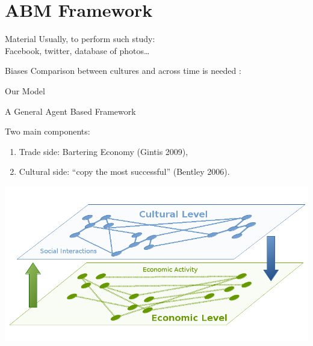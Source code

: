 \documentclass[12pt, notes=show]{beamer}
\begin{document}
\section{ABM Framework}


\begin{frame}{Material}
Usually, to perform such study:\\
	Facebook, twitter, database of photos\dots\\
	    \vspace{.5cm}
	    \begin{alertblock}{Biases} 
	Comparison between cultures and across time is needed : \\
	    \begin{center}
	    \end{center}
	
    \end{alertblock}
\end{frame}

\begin{frame}
    \centering
    \Large
    Our Model
\end{frame}

\begin{frame}{A General Agent Based Framework }

     Two main components:
     \vfill
    \begin{enumerate}
	\item Trade side: Bartering Economy (Gintis 2009),
	\item Cultural side: ``copy the most successful'' (Bentley 2006).
    \end{enumerate}
    \begin{center}
	\includegraphics[width=.8\textwidth]{images/interaction}	
    \end{center}
\end{frame}
	
\end{document}
